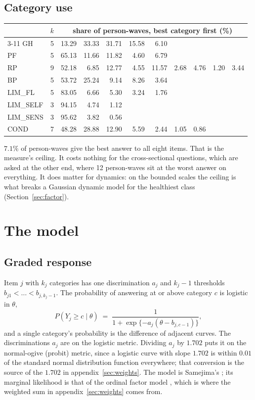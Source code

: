 \documentclass[11pt]{article}
\begin{document}
\subsection{Category use}

\begin{center}\small
\begin{tabular}{lr rrrrrrrrr}
\toprule
& $k$ & \multicolumn{9}{c}{share of person-waves, best category first (\%)} \\
\cmidrule(l){3-11}
GH & 5 & 13.29 & 33.33 & 31.71 & 15.58 & 6.10 & & & & \\
PF & 5 & 65.13 & 11.66 & 11.82 & 4.60 & 6.79 & & & & \\
RP & 9 & 52.18 & 6.85 & 12.77 & 4.55 & 11.57 & 2.68 & 4.76 & 1.20 & 3.44 \\
BP & 5 & 53.72 & 25.24 & 9.14 & 8.26 & 3.64 & & & & \\
LIM\_FL & 5 & 83.05 & 6.66 & 5.30 & 3.24 & 1.76 & & & & \\
LIM\_SELF & 3 & 94.15 & 4.74 & 1.12 & & & & & & \\
LIM\_SENS & 3 & 95.62 & 3.82 & 0.56 & & & & & & \\
COND & 7 & 48.28 & 28.88 & 12.90 & 5.59 & 2.44 & 1.05 & 0.86 & & \\
\bottomrule
\end{tabular}
\end{center}

$7.1\%$ of person-waves give the best answer to all eight items. That is the
measure's ceiling. It costs nothing for the cross-sectional questions, which
are asked at the other end, where 12 person-waves sit at the worst answer on
everything. It does matter for dynamics: on the bounded scales the ceiling is
what breaks a Gaussian dynamic model for the healthiest class
(Section~\ref{sec:factor}).

\section{The model}

\subsection{Graded response}

Item $j$ with $k_j$ categories has one discrimination $a_j$ and $k_j-1$
thresholds $b_{j1} < \dots < b_{j,k_j-1}$. The probability of answering at or
above category $c$ is logistic in $\theta$,
\[
P(Y_j \ge c \mid \theta) \;=\; \frac{1}{1 + \exp\{-a_j(\theta - b_{j,c-1})\}},
\]
and a single category's probability is the difference of adjacent curves. The
discriminations $a_j$ are on the logistic metric. Dividing $a_j$ by $1.702$
puts it on the normal-ogive (probit) metric, since a logistic curve with slope
$1.702$ is within $0.01$ of the standard normal distribution function
everywhere; that conversion is the source of the $1.702$ in
appendix~\ref{sec:weights}. The
model is Samejima's \citep{samejima1969}; its marginal likelihood is that of the ordinal factor model
\citep{takane1987}, which is where the weighted sum in appendix~\ref{sec:weights} comes from.
\end{document}
